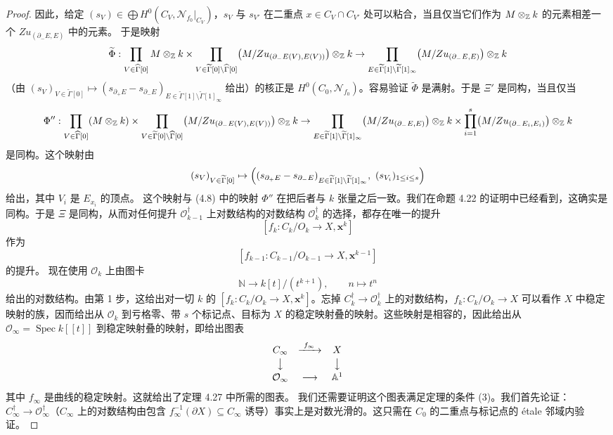 \begin{proof}
因此，给定 $(s_V)\in\bigoplus H^0(C_V,\mathcal N_{f_0}|_{C_V})$，$s_V$ 与 $s_{V'}$ 在二重点 $x\in C_V\cap C_{V'}$ 处可以粘合，当且仅当它们作为 $M\otimes_{\mathbb{Z}} k$ 的元素相差一个 $Zu_{(\partial_-E,E)}$ 中的元素。
于是映射
\[
\widetilde\Phi:\prod_{V\in\widehat\Gamma[0]}M\otimes_{\mathbb{Z}} k\times\prod_{V\in\widetilde\Gamma[0]\setminus\widehat\Gamma[0]}\bigl(M/Zu_{(\partial_-E(V),E(V))}\bigr)\otimes_{\mathbb{Z}} k\to\prod_{E\in\widetilde\Gamma[1]\setminus\widetilde\Gamma[1]_\infty}\bigl(M/Zu_{(\partial_-E,E)}\bigr)\otimes_{\mathbb{Z}} k
\]
（由 $(s_V)_{V\in\widetilde\Gamma[0]}\mapsto(s_{\partial_+E}-s_{\partial_-E})_{E\in\widetilde\Gamma[1]\setminus\widetilde\Gamma[1]_\infty}$ 给出）的核正是 $H^0(C_0,\mathcal N_{f_0})$。容易验证 $\widetilde\Phi$ 是满射。于是 $\Xi'$ 是同构，当且仅当
\[
\Phi'':\prod_{V\in\widehat\Gamma[0]}(M\otimes_{\mathbb{Z}} k)\times\prod_{V\in\widetilde\Gamma[0]\setminus\widehat\Gamma[0]}\bigl(M/Zu_{(\partial_-E(V),E(V))}\bigr)\otimes_{\mathbb{Z}} k\to\prod_{E\in\widetilde\Gamma[1]\setminus\widetilde\Gamma[1]_\infty}\bigl(M/Zu_{(\partial_-E,E)}\bigr)\otimes_{\mathbb{Z}} k\times\prod_{i=1}^s\bigl(M/Zu_{(\partial_-E_i,E_i)}\bigr)\otimes_{\mathbb{Z}} k
\]
是同构。这个映射由
\[
(s_V)_{V\in\widetilde\Gamma[0]}\mapsto\Bigl((s_{\partial_+E}-s_{\partial_-E})_{E\in\widetilde\Gamma[1]\setminus\widetilde\Gamma[1]_\infty},\ (s_{V_i})_{1\le i\le s}\Bigr)
\]
给出，其中 $V_i$ 是 $E_{x_i}$ 的顶点。
这个映射与 (4.8) 中的映射 $\Phi''$ 在把后者与 $k$ 张量之后一致。我们在命题 4.22 的证明中已经看到，这确实是同构。于是 $\Xi$ 是同构，从而对任何提升 $\mathcal O^\dagger_{k-1}$ 上对数结构的对数结构 $\mathcal O^\dagger_k$ 的选择，都存在唯一的提升
\[
[f_k:C_k/O_k\to X,\mathbf{x}^k]
\]
作为
\[
[f_{k-1}:C_{k-1}/O_{k-1}\to X,\mathbf{x}^{k-1}]
\]
的提升。
 现在使用 $\mathcal O_k$ 上由图卡
\[
\mathbb{N}\to k[t]/(t^{k+1}),\qquad n\mapsto t^n
\]
给出的对数结构。由第 1 步，这给出对一切 $k$ 的 $[f_k:C_k/O_k\to X,\mathbf{x}^k]$。忘掉 $C^\dagger_k\to\mathcal O^\dagger_k$ 上的对数结构，$f_k:C_k/O_k\to X$ 可以看作 $X$ 中稳定映射的族，因而给出从 $\mathcal O_k$ 到亏格零、带 $s$ 个标记点、目标为 $X$ 的稳定映射叠的映射。这些映射是相容的，因此给出从 $\mathcal O_\infty=\operatorname{Spec}k[[t]]$ 到稳定映射叠的映射，即给出图表
\[
\begin{array}{ccc}
C_\infty & \xrightarrow{\ f_\infty\ } & X\\[2pt]
\big\downarrow & & \big\downarrow\\[2pt]
\mathcal O_\infty & \longrightarrow & \mathbb{A}^1
\end{array}
\]
其中 $f_\infty$ 是曲线的稳定映射。这就给出了定理 4.27 中所需的图表。
我们还需要证明这个图表满足定理的条件 (3)。我们首先论证：$C^\dagger_\infty\to\mathcal O^\dagger_\infty$（$C_\infty$ 上的对数结构由包含 $f^{-1}_\infty(\partial X)\subseteq C_\infty$ 诱导）事实上是对数光滑的。这只需在 $C_0$ 的二重点与标记点的 étale 邻域内验证。


\end{proof}

